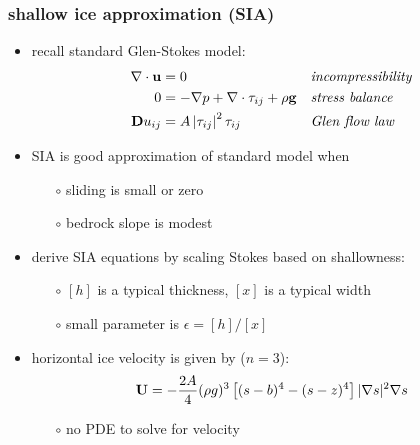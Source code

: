 \documentclass[10pt,hyperref={pdfpagelabels=true}]{beamer}
\newcommand{\eps}{\epsilon}
\begin{document}
\begin{frame}
  \frametitle{shallow ice approximation (SIA)}

\begin{itemize}
\item recall standard Glen-Stokes model:
\small
\begin{align*}
\nabla \cdot \mathbf{u} &= 0 &&\text{\emph{incompressibility}} \\
0 &= - \nabla p + \nabla \cdot \tau_{ij} + \rho \mathbf{g} &&\text{\emph{stress balance}} \\
\mathbf{D}u_{ij} &= A \left|\tau_{ij}\right|^2 \tau_{ij} &&\text{\emph{Glen flow law}}
\end{align*}
\normalsize
\item SIA is good approximation of standard model when
  \begin{itemize}
  \item[$\circ$] sliding is small or zero
  \item[$\circ$] bedrock slope is modest
  \end{itemize}
\item derive SIA equations by scaling Stokes based on shallowness:
  \begin{itemize}
  \item[$\circ$] $[h]$ is a typical thickness, $[x]$ is a typical width
  \item[$\circ$] small parameter is $\eps = [h] / [x]$
  \end{itemize}
\item horizontal ice velocity is given by ($n=3$): 
  $${\bf U}  =  - \frac{2 A}{4} (\rho g)^{3} \left[ (s-b)^4 - (s - z)^4  \right] 
|\nabla s |^{2} \nabla s$$

\vspace{-2mm}
  \begin{itemize}
  \item[$\circ$] no PDE to solve for velocity
  \end{itemize}
\end{itemize}
\end{frame}
\end{document}
